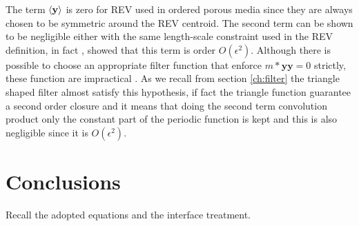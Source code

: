 The term ${\left< \mathbf{y} \right>}$ is zero for REV used in ordered porous media since they are always chosen to be symmetric around the REV centroid.
The second term can be shown to be negligible either with the same length-scale constraint used in the REV definition, in fact \citet{ochoa1995momentum}, \citet{paez2017macroscopic} showed that this term is order $O(\epsilon^2)$.
Although there is possible to choose an appropriate filter function that  enforce $m*\mathbf{y}\mathbf{y} =0$ strictly, these function are impractical \citet{davit2017technical}.
As we recall from section \ref{ch:filter} the triangle shaped filter almost satisfy this hypothesis, if fact the triangle function guarantee a second order closure and it means that doing the second term convolution product only the constant part of the periodic function is kept and this is also negligible since it is $O(\epsilon^2)$.

\section{Conclusions}

Recall the adopted equations and the interface treatment.